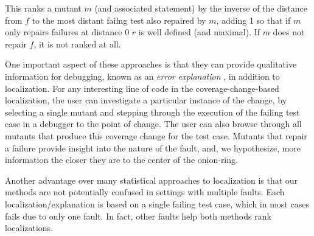 This ranks a mutant $m$ (and associated statement) by the inverse of the distance
from $f$ to the most distant failng test also repaired by $m$, adding 1
so that if $m$ only repairs failures at distance 0 $r$ is well defined
(and maximal).
If $m$ does not repair $f$, it is not ranked at all.

One important aspect of these approaches is that they 
can provide qualitative information for debugging, known as an \emph{error
  explanation} \cite{GroceError}, in addition to localization.  For any
interesting line of code in the coverage-change-based localization,
the user can investigate a particular instance of the change,
by selecting a single mutant and stepping through the execution of the
failing test case in a debugger to the point of change.  The user can also
browse through all mutants that produce this coverage change for the test
case.  Mutants that repair a failure provide insight
into the nature of the fault, and, we hypothesize, more information the
closer they are to the center of the onion-ring.

Another advantage over many statistical approaches to
localization is that our methods are not potentially confused in
settings with multiple faults.  Each localization/explanation is based
on a single failing test case, which in most cases fails due to only one
fault.  In fact, other faults help both methods rank localizations.